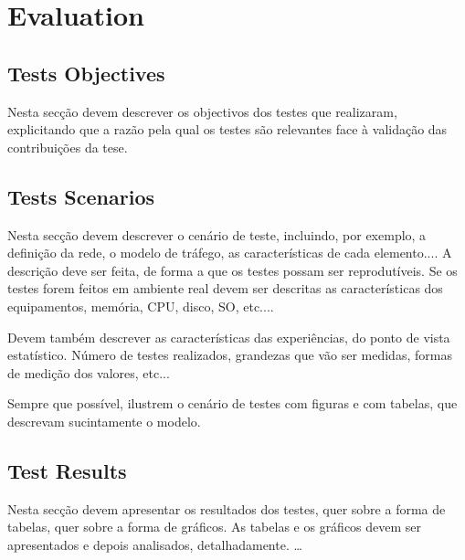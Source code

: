 \chapter{Evaluation}\label{evaluation}
\section{Tests Objectives}
Nesta secção devem descrever os objectivos dos testes que realizaram, explicitando
que a razão pela qual os testes são relevantes face à validação das contribuições da
tese.

\section{Tests Scenarios}
Nesta secção devem descrever o cenário de teste, incluindo, por exemplo, a
definição da rede, o modelo de tráfego, as características de cada elemento....
A descrição deve ser feita, de forma a que os testes possam ser reprodutíveis.
Se os testes forem feitos em ambiente real devem ser descritas as características
dos equipamentos, memória, CPU, disco, SO, etc....

Devem também descrever as características das experiências, do ponto de vista
estatístico. Número de testes realizados, grandezas que vão ser medidas, formas de
medição dos valores, etc...

Sempre que possível, ilustrem o cenário de testes com figuras e com tabelas, que
descrevam sucintamente o modelo.

\section{Test Results}
Nesta secção devem apresentar os resultados dos testes, quer sobre a forma
de tabelas, quer sobre a forma de gráficos. As tabelas e os gráficos devem ser
apresentados e depois analisados, detalhadamente.
\ldots
